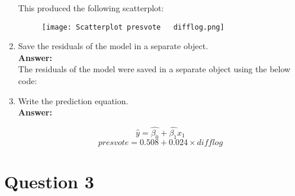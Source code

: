 \documentclass[12pt,letterpaper]{article}
\begin{document}
\begin{enumerate}
		This produced the following scatterplot:
		
		\begin{figure}[H]\centering
			\caption{\footnotesize}
			\texttt{[image: Scatterplot presvote ~ difflog.png]}
		\end{figure} 
		
		\item Save the residuals of the model in a separate object.\\
		
		\textbf{Answer:}\\
		
		The residuals of the model were saved in a separate object using the below code:
		
		\vspace{.5cm}
		
		  
		
		\vspace{.5cm}
		
		\item Write the prediction equation.\\
		
		\textbf{Answer:}
		
			\[\hat{y} = \hat{\beta_0} + \hat{\beta_1}x_1 \]
			\[presvote = 0.508 + 0.024\times difflog \]
		
	\end{enumerate}
	
	\newpage	
\section*{Question 3}
\end{document}
